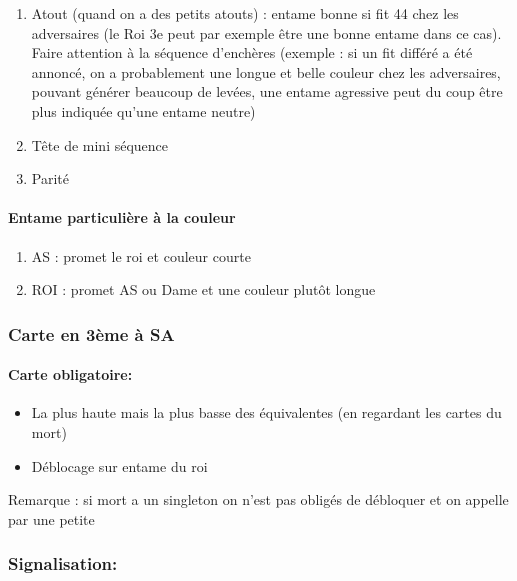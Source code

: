 \documentclass[a4paper]{article}
\begin{document}
\begin{enumerate}
\item Atout (quand on a des petits atouts) : entame bonne si fit 44 chez les adversaires (le Roi 3e peut par exemple être une bonne entame dans ce cas). Faire attention à la séquence d’enchères (exemple : si un fit différé a été annoncé, on a probablement une longue et belle couleur chez les adversaires, pouvant générer beaucoup de levées, une entame agressive peut du coup être plus indiquée qu’une entame neutre)

\item Tête de mini séquence

\item Parité

\end{enumerate}

\paragraph{Entame particulière à la couleur}

\begin{enumerate}
\item AS : promet le roi et couleur courte

\item ROI : promet AS ou Dame et une couleur plutôt longue

\end{enumerate}

\subsubsection{Carte en 3ème à SA}

\paragraph{Carte obligatoire:}

\begin{itemize}
\item La plus haute mais la plus basse des équivalentes (en regardant les cartes du mort)

\item Déblocage sur entame du roi

\end{itemize}

Remarque : si mort a un singleton on n’est pas obligés de débloquer et on appelle par une petite

\subsubsection{Signalisation:}
\end{document}
